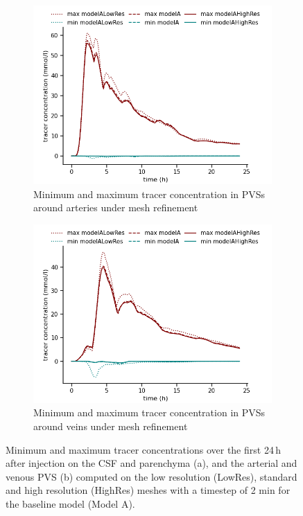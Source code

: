 \begin{figure}
\begin{subfigure}[b]{0.45\textwidth}
        \centering
        \includegraphics[width = 1 \linewidth]{figures/art_minmax.png}
        \caption{Minimum and maximum tracer concentration in PVSs around arteries under mesh refinement}
    \end{subfigure}
    \begin{subfigure}[b]{0.45\textwidth}
        \centering
     \includegraphics[width= 1 \linewidth]{figures/ven_minmax.png}
         \caption{Minimum and maximum tracer concentration in PVSs around veins under mesh refinement}
    \end{subfigure}
    \caption{Minimum and maximum tracer concentrations over the first 24\,h after injection on the CSF and parenchyma (a), and the arterial and venous PVS (b) computed on the low resolution (LowRes), standard and high resolution (HighRes) meshes with a timestep of 2 min for the baseline model (Model A).}
    \label{fig:mesh_convergence_concentrations}
\end{figure}
